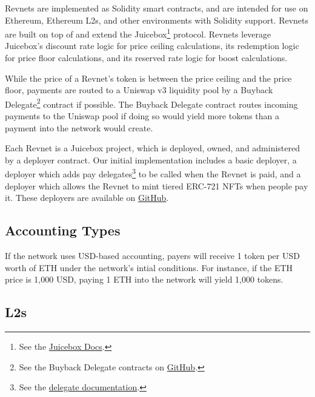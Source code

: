 \documentclass{article}
\begin{document}
Revnets are implemented as Solidity smart contracts, and are intended for use on Ethereum, Ethereum L2s, and other environments with Solidity support. Revnets are built on top of and extend the Juicebox\footnote{See the \href{https://docs.juicebox.money}{Juicebox Docs}.} protocol. Revnets leverage Juicebox's discount rate logic for price ceiling calculations, its redemption logic for price floor calculations, and its reserved rate logic for boost calculations.

While the price of a Revnet's token is between the price ceiling and the price floor, payments are routed to a Uniswap v3 liquidity pool by a Buyback Delegate\footnote{See the Buyback Delegate contracts on \href{https://github.com/jbx-protocol/juice-buyback}{GitHub}.} contract if possible. The Buyback Delegate contract routes incoming payments to the Uniswap pool if doing so would yield more tokens than a payment into the network would create.

Each Revnet is a Juicebox project, which is deployed, owned, and administered by a deployer contract. Our initial implementation includes a basic deployer, a deployer which adds pay delegates\footnote{See the \href{https://docs.juicebox.money/dev/learn/glossary/delegate/}{delegate documentation}.} to be called when the Revnet is paid, and a deployer which allows the Revnet to mint tiered ERC-721 NFTs when people pay it. These deployers are available on \href{https://github.com/mejango/retailism-templates}{GitHub}.

\subsection{Accounting Types}\label{sec:accounting_types}

If the network uses USD-based accounting, payers will receive 1 token per USD worth of ETH under the network's intial conditions. For instance, if the ETH price is 1,000 USD, paying 1 ETH into the network will yield 1,000 tokens.

\subsection{L2s}
\end{document}
